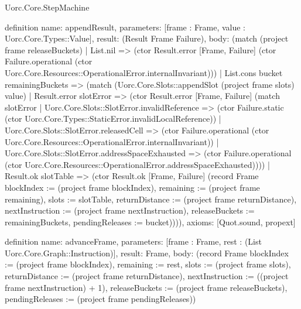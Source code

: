 \begin{lexlean}{Uorc.Core.StepMachine}
\begin{semanticmodule}
definition{
  name: appendResult,
  parameters: [frame : Frame, value : Uorc.Core.Types::Value],
  result: (Result Frame Failure),
  body: (match (project frame releaseBuckets)
    | List.nil => (ctor Result.error [Frame, Failure] (ctor Failure.operational (ctor Uorc.Core.Resources::OperationalError.internalInvariant)))
    | List.cons bucket remainingBuckets => (match (Uorc.Core.Slots::appendSlot (project frame slots) value)
      | Result.error slotError => (ctor Result.error [Frame, Failure] (match slotError
        | Uorc.Core.Slots::SlotError.invalidReference => (ctor Failure.static (ctor Uorc.Core.Types::StaticError.invalidLocalReference))
        | Uorc.Core.Slots::SlotError.releasedCell => (ctor Failure.operational (ctor Uorc.Core.Resources::OperationalError.internalInvariant))
        | Uorc.Core.Slots::SlotError.addressSpaceExhausted => (ctor Failure.operational (ctor Uorc.Core.Resources::OperationalError.addressSpaceExhausted))))
      | Result.ok slotTable => (ctor Result.ok [Frame, Failure] (record Frame {blockIndex := (project frame blockIndex), remaining := (project frame remaining), slots := slotTable, returnDistance := (project frame returnDistance), nextInstruction := (project frame nextInstruction), releaseBuckets := remainingBuckets, pendingReleases := bucket})))),
  axioms: [Quot.sound, propext]
}

definition{
  name: advanceFrame,
  parameters: [frame : Frame, rest : (List Uorc.Core.Graph::Instruction)],
  result: Frame,
  body: (record Frame {blockIndex := (project frame blockIndex), remaining := rest, slots := (project frame slots), returnDistance := (project frame returnDistance), nextInstruction := ((project frame nextInstruction) + 1), releaseBuckets := (project frame releaseBuckets), pendingReleases := (project frame pendingReleases)})
}


\end{semanticmodule}
\end{lexlean}
